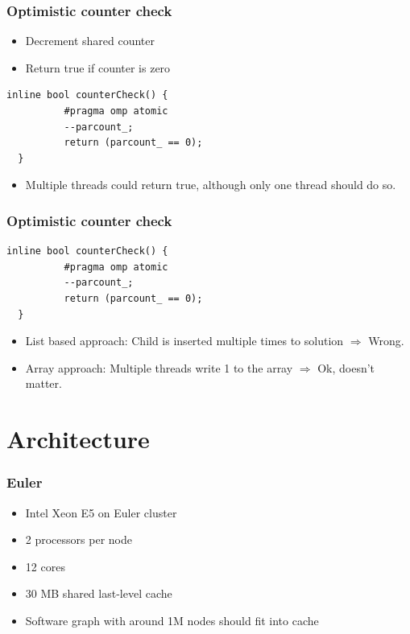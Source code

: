 \begin{frame}[fragile]
 \frametitle{Optimistic counter check}
 \begin{itemize}
  \item Decrement shared counter
  \item Return true if counter is zero
 \end{itemize}
 \begin{lstlisting}[style=cpp]
  inline bool counterCheck() {
          #pragma omp atomic
          --parcount_;
          return (parcount_ == 0);
  }
 \end{lstlisting}
 \begin{itemize}
  \item Multiple threads could return true, although only one thread should do so.
 \end{itemize}
\end{frame}

\begin{frame}[fragile]
 \frametitle{Optimistic counter check}
  \begin{lstlisting}[style=cpp]
  inline bool counterCheck() {
          #pragma omp atomic
          --parcount_;
          return (parcount_ == 0);
  }
 \end{lstlisting}
 \begin{itemize}
  \item List based approach: Child is inserted multiple times to solution $\Rightarrow$ Wrong.
  \item Array approach: Multiple threads write 1 to the array $\Rightarrow$ Ok, doesn't matter.
 \end{itemize}
\end{frame}

\section{Architecture}
\begin{frame}
  \frametitle{Euler}
  \begin{itemize}
  \item Intel Xeon E5 on Euler cluster
  \item 2 processors per node
  \item 12 cores
  \item 30 MB shared last-level cache
  \item Software graph with around 1M nodes should fit into cache %
  \end{itemize}
\end{frame}

